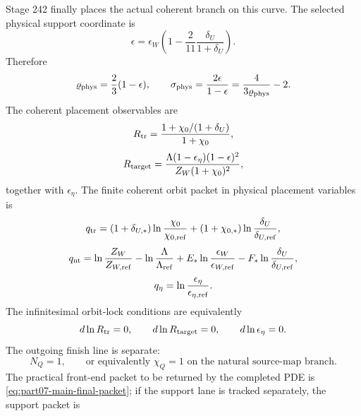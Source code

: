 Stage 242 finally places the actual coherent branch on this curve.  The selected physical support coordinate is
\begin{equation}
\label{eq:part07-epsilon-physical}
\epsilon
=
\epsilon_W\left(1-\frac{2}{11}\frac{\delta_U}{1+\delta_U}\right).
\end{equation}
Therefore
\begin{equation}
\label{eq:part07-varrho-phys-sigma-phys}
\varrho_{\rm phys}=\frac23(1-\epsilon),
\qquad
\sigma_{\rm phys}=\frac{2\epsilon}{1-\epsilon}
=\frac{4}{3\varrho_{\rm phys}}-2.
\end{equation}
The coherent placement observables are
\begin{equation}
\label{eq:part07-rtr-coherent}
R_{\rm tr}
=
\frac{1+\chi_0/(1+\delta_U)}{1+\chi_0},
\end{equation}
\begin{equation}
\label{eq:part07-rtarget-coherent}
R_{\rm target}
=
\frac{\Lambda(1-\epsilon_\eta)(1-\epsilon)^2}{Z_W(1+\chi_0)^2},
\end{equation}
together with \(\epsilon_\eta\).  The finite coherent orbit packet in physical placement variables is
\begin{equation}
\label{eq:part07-stage242-qtr}
q_{\rm tr}
=(1+\delta_{U,*})\ln\frac{\chi_0}{\chi_{0,\rm ref}}
+(1+\chi_{0,*})\ln\frac{\delta_U}{\delta_{U,\rm ref}},
\end{equation}
\begin{equation}
\label{eq:part07-stage242-qnt}
q_{\rm nt}
=
\ln\frac{Z_W}{Z_{W,\rm ref}}
-
\ln\frac{\Lambda}{\Lambda_{\rm ref}}
+E_*\ln\frac{\epsilon_W}{\epsilon_{W,\rm ref}}
-F_*\ln\frac{\delta_U}{\delta_{U,\rm ref}},
\end{equation}
\begin{equation}
\label{eq:part07-stage242-qeta}
q_\eta=\ln\frac{\epsilon_\eta}{\epsilon_{\eta,\rm ref}}.
\end{equation}
The infinitesimal orbit-lock conditions are equivalently
\begin{equation}
\label{eq:part07-stage242-orbit-lock-inf}
d\ln R_{\rm tr}=0,
\qquad
d\ln R_{\rm target}=0,
\qquad
d\ln\epsilon_\eta=0.
\end{equation}
The outgoing finish line is separate:
\begin{equation}
\label{eq:part07-stage242-nq}
N_Q=1,
\qquad
\text{or equivalently }\chi_Q=1\text{ on the natural source-map branch.}
\end{equation}
The practical front-end packet to be returned by the completed PDE is \cref{eq:part07-main-final-packet}; if the support lane is tracked separately, the support packet is

